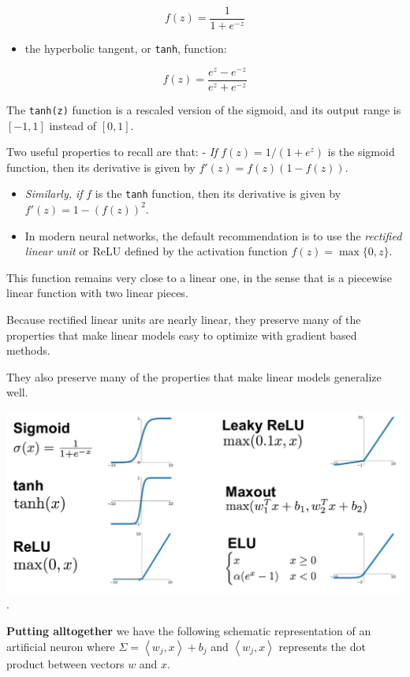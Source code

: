 \documentclass[
  letterpaper,
  DIV=11,
  numbers=noendperiod,
  oneside]{scrartcl}
\providecommand{\tightlist}{%
  \setlength{\itemsep}{0pt}\setlength{\parskip}{0pt}}\usepackage{longtable,booktabs,array}
\begin{document}
\[
f(z)=\frac{1}{1+e^{-z}}
\]

\begin{itemize}
\tightlist
\item
  the hyperbolic tangent, or \texttt{tanh}, function:
\end{itemize}

\[
f(z)=\frac{e^{z}-e^{-z}}{e^{z}+e^{-z}}
\]

The \texttt{tanh(z)} function is a rescaled version of the sigmoid, and
its output range is \([-1,1]\) instead of \([0,1]\).

Two useful properties to recall are that: - \emph{If} \(f(z)=1/(1+e^z)\)
is the sigmoid function, then its derivative is given by
\(f'(z)=f(z)(1-f(z))\).

\begin{itemize}
\item
  \emph{Similarly, if} \(f\) is the \texttt{tanh} function, then its
  derivative is given by \(f'(z)=1-(f(z))^2\).
\item
  In modern neural networks, the default recommendation is to use the
  \emph{rectified linear unit} or ReLU defined by the activation
  function \(f(z)=\max\{0,z\}\).
\end{itemize}

This function remains very close to a linear one, in the sense that is a
piecewise linear function with two linear pieces.

Because rectified linear units are nearly linear, they preserve many of
the properties that make linear models easy to optimize with gradient
based methods.

They also preserve many of the properties that make linear models
generalize well.

\href{https://medium.com/@shrutijadon/survey-on-activation-functions-for-deep-learning-9689331ba092}{\includegraphics{images/ActivationFunctions.png}}.

\textbf{Putting alltogether} we have the following schematic
representation of an artificial neuron where
\(\Sigma=\left\langle w_{j}, x\right\rangle+ b_{j}\) and
\(\left\langle w_{j}, x\right\rangle\) represents the dot product
between vectors \(w\) and \(x\).
\end{document}
